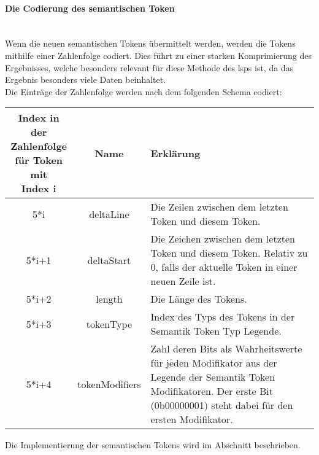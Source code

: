 \documentclass[./einleitung.tex]{subfiles}
\begin{document}
    \paragraph{Die Codierung des semantischen Token}\label{par:semantic-code}\mbox{}\\
    Wenn die neuen semantischen Tokens übermittelt werden, werden die Tokens mithilfe einer Zahlenfolge codiert.
    Dies führt zu einer starken Komprimierung des Ergebnisses, welche besonders relevant für diese Methode des \acrshort{lsp}s ist, da das Ergebnis besonders viele Daten beinhaltet.\\
    Die Einträge der Zahlenfolge werden nach dem folgenden Schema codiert:
    \begin{center}
        \begin{tabular}{| c | c | m{21.5em} |}
            \hline
            \makecell{Index in der\\ Zahlenfolge\\für Token mit \\Index i} & Name & Erklärung \\
            \hline
            5*i & deltaLine & Die Zeilen zwischen dem letzten Token und diesem Token. \\
            \hline
            5*i+1 & deltaStart & Die Zeichen zwischen dem letzten Token und diesem Token.
            Relativ zu 0, falls der aktuelle Token in einer neuen Zeile ist. \\
            \hline
            5*i+2 & length & Die Länge des Tokens. \\
            \hline
            5*i+3 & tokenType & Index des Typs des Tokens in der Semantik Token Typ Legende. \\
            \hline
            5*i+4 & tokenModifiers & Zahl deren Bits als Wahrheitswerte für jeden Modifikator aus der Legende der Semantik Token Modifikatoren.
            Der erste Bit (0b00000001) steht dabei für den ersten Modifikator. \\
            \hline
        \end{tabular}
    \end{center}
    Die Implementierung der semantischen Tokens wird im Abschnitt  beschrieben.
\end{document}
